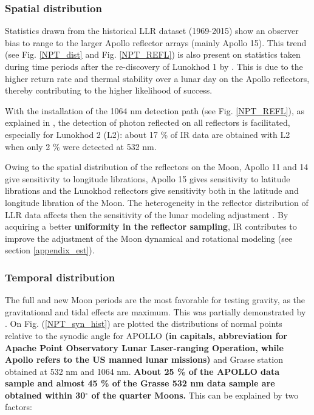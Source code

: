 \documentclass[fleqn,usenatbib,referee]{mnras}
\begin{document}
      \subsubsection{Spatial distribution}
      \label{sel_bias}
       Statistics drawn from the historical LLR dataset (1969-2015) show an observer bias to range to the larger Apollo reflector arrays (mainly Apollo 15). This trend (see Fig. \ref{NPT_dist} and Fig. \ref{NPT_REFL}) is also present on statistics taken during time periods after the re-discovery of Lunokhod 1 by \cite{Murphy2011}.
       This is due to the higher return rate and thermal stability over a lunar day on the Apollo reflectors, thereby contributing to the higher likelihood of success. 
       
       With the installation of the 1064 nm detection path (see Fig. \ref{NPT_REFL}), as explained in \cite{Courde2017}, the detection of photon reflected on all reflectors is facilitated, especially for Lunokhod 2 (L2): about 17 \% of IR data are obtained with L2 when only 2 \% were detected at 532 nm.
 
        Owing to the spatial distribution of the reflectors on the Moon, Apollo 11 and 14 give sensitivity to longitude librations, Apollo 15 gives sensitivity to latitude librations and the Lunokhod reflectors give sensitivity both in the latitude and longitude libration of the Moon.  The heterogeneity in the reflector distribution of LLR data affects then the sensitivity of the lunar modeling adjustment \cite[]{2016EGUGA..1813995V}.
         By acquiring a better \textbf{uniformity in the reflector sampling}, IR contributes to improve the adjustment of the Moon dynamical and rotational modeling (see section \ref{appendix_est}). 

\subsubsection{Temporal distribution}
      \label{phas_bias}
    The full and new Moon periods are the most favorable for testing gravity, as the gravitational and tidal effects are maximum. This was partially demonstrated by \cite{1998CQGra..15.3363N}.
      On Fig. (\ref{NPT_syn_hist}) are plotted the distributions of normal points relative to the synodic angle for APOLLO \textbf{(in capitals, abbreviation for Apache Point Observatory Lunar Laser-ranging Operation, while Apollo refers to the US manned lunar missions)} and Grasse station obtained at 532 nm and 1064 nm. \textbf{About 25 \% of the APOLLO data sample and almost 45 \% of the Grasse 532 nm data sample are obtained within 30$^{\circ}$ of the quarter Moons.} This can be explained by two factors:
      
\end{document}

